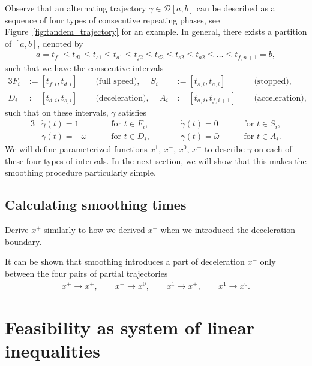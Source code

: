 \documentclass[a4paper]{article}
\theoremstyle{definition}
\theoremstyle{plain}
\begin{document}
Observe that an alternating trajectory $\gamma \in \mathcal{D}[a,b]$ can be described
as a sequence of four types of consecutive repeating phases, see
Figure~\ref{fig:tandem_trajectory} for an example.
%
In general, there exists a partition of $[a,b]$, denoted by
\begin{align*}
  a = t_{f1} \leq t_{d1} \leq t_{s1} \leq t_{a1} \leq t_{f2} \leq t_{d2} \leq t_{s2} \leq t_{a2} \leq \dots \leq t_{f,n+1} = b,
\end{align*}
such that we have the consecutive intervals
\begin{alignat*}{3}
  F_{i} &:= [t_{f,i}, t_{d,i}] \quad &\text{ (full speed), } \quad
  S_{i} &:= [t_{s,i}, t_{a,i}] \quad &\text{ (stopped), } \\
  D_{i} &:= [t_{d,i}, t_{s,i}] \quad &\text{ (deceleration), } \quad
  A_{i} &:= [t_{a,i}, t_{f,i+1}] \quad  &\text{ (acceleration), }
\end{alignat*}
%
such that on these intervals, $\gamma$ satisfies
%
\begin{alignat*}{3}
  &\dot{\gamma}(t) = 1 && \text{ for } t \in F_{i} , \quad \quad
  &&\dot{\gamma}(t) = 0 && \text{ for } t \in S_{i} ,\\
  &\ddot{\gamma}(t) = -\omega \quad && \text{ for } t \in D_{i} , \quad \quad
  &&\ddot{\gamma}(t) = \bar{\omega} \quad && \text{ for } t \in A_{i} .
\end{alignat*}
%
We will define parameterized functions $x^{1}$, $x^{-}$, $x^{0}$, $x^{+}$ to
describe $\gamma$ on each of these four types of intervals.
%
In the next section, we will show that this makes the smoothing procedure
particularly simple.

\subsection{Calculating smoothing times}

{\color{Navy}Derive $x^{+}$ similarly to how we derived $x^{-}$ when we
  introduced the deceleration boundary.}

It can be shown that smoothing introduces a part of deceleration $x^{-}$ only
between the four pairs of partial trajectories
\begin{align*}
    x^{+} \rightarrow x^{+} , \quad \quad
    x^{+} \rightarrow x^{0} , \quad \quad
    x^{1} \rightarrow x^{+} , \quad \quad
    x^{1} \rightarrow x^{0} .
\end{align*}
%

\section{Feasibility as system of linear inequalities}
\end{document}
